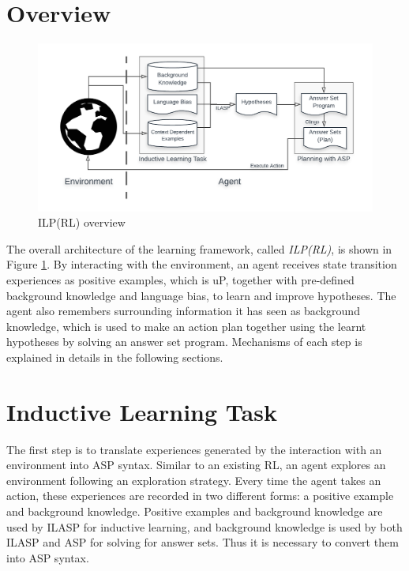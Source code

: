 \section{Overview}
\label{sec:overview}

\begin{figure}[!htb]
\centering
\includegraphics[width=1.0\textwidth]{./figures/architecture}
\caption{ILP(RL) overview}
\label{fig:ILPRL_overview}
\end{figure}

The overall architecture of the learning framework, called \textit{ILP(RL)}, is shown in Figure \ref{fig:ILPRL_overview}. 
By interacting with the environment, an agent receives state transition experiences as positive examples, which is uP, together with pre-defined background knowledge and language bias, to learn and improve hypotheses.
The agent also remembers surrounding information it has seen as background knowledge, which is used to make an action plan together using the learnt hypotheses by solving an answer set program.
Mechanisms of each step is explained in details in the following sections.

\section{Inductive Learning Task}
\label{sec:inductive_learning_task}


The first step is to translate experiences generated by the interaction with an environment into ASP syntax. 
Similar to an existing RL, an agent explores an environment following an exploration strategy.
Every time the agent takes an action, these experiences are recorded in two different forms: 
a positive example and background knowledge. 
Positive examples and background knowledge are used by ILASP for inductive learning, and background knowledge is used by both ILASP and ASP for solving for answer sets.
Thus it is necessary to convert them into ASP syntax.


